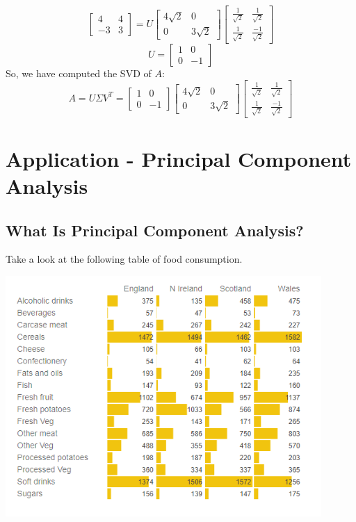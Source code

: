 \documentclass{article}
\begin{document}
$$\begin{bmatrix}4& 4\\-3& 3\end{bmatrix} = U \begin{bmatrix}4\sqrt{2}& 0\\0& 3\sqrt{2}\end{bmatrix}
\begin{bmatrix}\frac{1}{\sqrt{2}}&\frac{1}{\sqrt{2}}\\\frac{1}{\sqrt{2}}&\frac{-1}{\sqrt{2}}\end{bmatrix}$$
$$U = \begin{bmatrix}1& 0\\0& -1\end{bmatrix}$$
So, we have computed the SVD of $A$:
$$A = U \Sigma V^T = \begin{bmatrix}1& 0\\0& -1\end{bmatrix}
\begin{bmatrix}4\sqrt{2}& 0\\0& 3\sqrt{2}\end{bmatrix}
\begin{bmatrix}\frac{1}{\sqrt{2}}&\frac{1}{\sqrt{2}}\\\frac{1}{\sqrt{2}}&\frac{-1}{\sqrt{2}}\end{bmatrix}$$

\newpage
\section{Application - Principal Component Analysis}
\subsection{What Is Principal Component Analysis?}
Take a look at the following table of food consumption.

\begin{center}
\includegraphics[width=12cm]{(17)}
\end{center}
\end{document}
